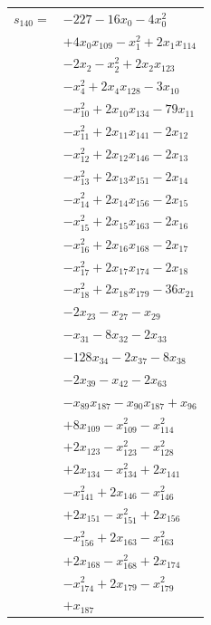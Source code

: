 \begin{longtable}{@{}r@{\;}l@{}}
\(s_{140}=\) & \(\displaystyle -227 -16x_{0} -4x_{0}^{2}\) \\
 & \(\displaystyle +4x_{0}x_{109} -x_{1}^{2} +2x_{1}x_{114}\) \\
 & \(\displaystyle -2x_{2} -x_{2}^{2} +2x_{2}x_{123}\) \\
 & \(\displaystyle -x_{4}^{2} +2x_{4}x_{128} -3x_{10}\) \\
 & \(\displaystyle -x_{10}^{2} +2x_{10}x_{134} -79x_{11}\) \\
 & \(\displaystyle -x_{11}^{2} +2x_{11}x_{141} -2x_{12}\) \\
 & \(\displaystyle -x_{12}^{2} +2x_{12}x_{146} -2x_{13}\) \\
 & \(\displaystyle -x_{13}^{2} +2x_{13}x_{151} -2x_{14}\) \\
 & \(\displaystyle -x_{14}^{2} +2x_{14}x_{156} -2x_{15}\) \\
 & \(\displaystyle -x_{15}^{2} +2x_{15}x_{163} -2x_{16}\) \\
 & \(\displaystyle -x_{16}^{2} +2x_{16}x_{168} -2x_{17}\) \\
 & \(\displaystyle -x_{17}^{2} +2x_{17}x_{174} -2x_{18}\) \\
 & \(\displaystyle -x_{18}^{2} +2x_{18}x_{179} -36x_{21}\) \\
 & \(\displaystyle -2x_{23} -x_{27} -x_{29}\) \\
 & \(\displaystyle -x_{31} -8x_{32} -2x_{33}\) \\
 & \(\displaystyle -128x_{34} -2x_{37} -8x_{38}\) \\
 & \(\displaystyle -2x_{39} -x_{42} -2x_{63}\) \\
 & \(\displaystyle -x_{89}x_{187} -x_{90}x_{187} +x_{96}\) \\
 & \(\displaystyle +8x_{109} -x_{109}^{2} -x_{114}^{2}\) \\
 & \(\displaystyle +2x_{123} -x_{123}^{2} -x_{128}^{2}\) \\
 & \(\displaystyle +2x_{134} -x_{134}^{2} +2x_{141}\) \\
 & \(\displaystyle -x_{141}^{2} +2x_{146} -x_{146}^{2}\) \\
 & \(\displaystyle +2x_{151} -x_{151}^{2} +2x_{156}\) \\
 & \(\displaystyle -x_{156}^{2} +2x_{163} -x_{163}^{2}\) \\
 & \(\displaystyle +2x_{168} -x_{168}^{2} +2x_{174}\) \\
 & \(\displaystyle -x_{174}^{2} +2x_{179} -x_{179}^{2}\) \\
 & \(\displaystyle +x_{187}\) \\[3pt]

\end{longtable}
